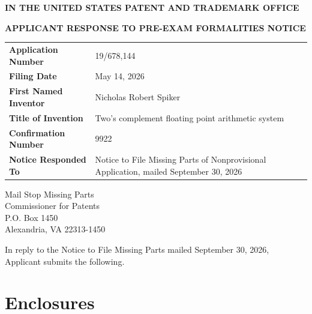\documentclass[12pt,letter]{article}
\begin{document}
\begin{center}
{\large\textbf{IN THE UNITED STATES PATENT AND TRADEMARK OFFICE}}\par\vspace{0.6em}
{\large\textbf{APPLICANT RESPONSE TO PRE-EXAM FORMALITIES NOTICE}}
\end{center}

\begin{tabular}{@{}>{\bfseries}p{5.2cm}p{10.5cm}@{}}
Application Number & 19/678,144 \\
Filing Date & May 14, 2026 \\
First Named Inventor & Nicholas Robert Spiker \\
Title of Invention & Two's complement floating point arithmetic system \\
Confirmation Number & 9922 \\
Notice Responded To & Notice to File Missing Parts of Nonprovisional Application, mailed September 30, 2026 \\
\end{tabular}

Mail Stop Missing Parts\\
Commissioner for Patents\\
P.O. Box 1450\\
Alexandria, VA 22313-1450

In reply to the Notice to File Missing Parts mailed September 30, 2026, Applicant submits the following.

\section*{Enclosures}
\end{document}
